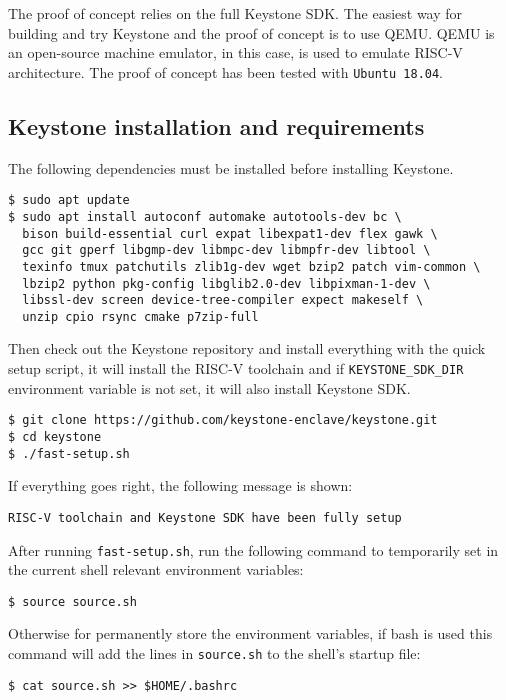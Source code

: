The proof of concept relies on the full Keystone SDK. The easiest way for building and try Keystone and the proof of concept is to use QEMU. QEMU is an open-source machine emulator, in this case, is used to emulate RISC-V architecture.
The proof of concept has been tested with \texttt{Ubuntu 18.04}. 
\subsection{Keystone installation and requirements}
The following dependencies must be installed before installing Keystone. \\
\begin{lstlisting}[style=terminal,frame=single]
$ sudo apt update
$ sudo apt install autoconf automake autotools-dev bc \
  bison build-essential curl expat libexpat1-dev flex gawk \ 
  gcc git gperf libgmp-dev libmpc-dev libmpfr-dev libtool \ 
  texinfo tmux patchutils zlib1g-dev wget bzip2 patch vim-common \
  lbzip2 python pkg-config libglib2.0-dev libpixman-1-dev \
  libssl-dev screen device-tree-compiler expect makeself \
  unzip cpio rsync cmake p7zip-full
\end{lstlisting}
Then check out the Keystone repository and install everything with the quick setup script, it will install the RISC-V toolchain and if \texttt{KEYSTONE\_SDK\_DIR} environment variable is not set, it will also install Keystone SDK. \\
\begin{lstlisting}[style=terminal,frame=single]
$ git clone https://github.com/keystone-enclave/keystone.git
$ cd keystone
$ ./fast-setup.sh
\end{lstlisting}
If everything goes right, the following message is shown: \\
\begin{lstlisting}[frame=single]
    RISC-V toolchain and Keystone SDK have been fully setup
\end{lstlisting}
After running \texttt{fast-setup.sh}, run the following command to temporarily set in the current shell relevant environment variables: \\
\begin{lstlisting}[style=terminal,frame=single]
$ source source.sh
\end{lstlisting}
Otherwise for permanently store the environment variables, if bash is used this command will add the lines in \texttt{source.sh} to the shell's startup file: \\
\begin{lstlisting}[style=terminal,frame=single]
$ cat source.sh >> $HOME/.bashrc
\end{lstlisting}
